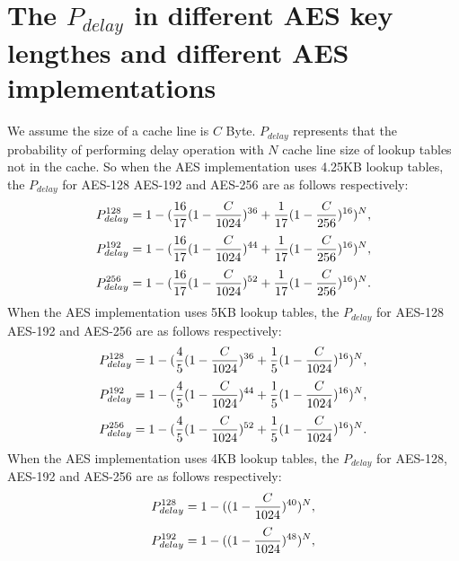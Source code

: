 \section{The $P_{delay}$ in different AES key lengthes and different AES implementations }
\label{appendixb}
We assume the size of a cache line is $C$ Byte. $P_{delay}$ represents that the probability of performing delay operation with $N$ cache line size of lookup tables not in the cache. So when the AES implementation uses 4.25KB lookup tables, the $P_{delay}$ for AES-128 AES-192 and AES-256 are as follows respectively:
\begin{equation}
    \scriptsize
    P_{delay}^{128} = 1- (\frac{16}{17}(1-\frac{C}{1024})^{36}+ \frac{1}{17}(1-\frac{C}{256})^{16})^{N},
\end{equation}
\begin{equation}
    \scriptsize
    P_{delay}^{192} = 1- (\frac{16}{17}(1-\frac{C}{1024})^{44}+ \frac{1}{17}(1-\frac{C}{256})^{16})^{N},
\end{equation}
\begin{equation}
    \scriptsize
    P_{delay}^{256} = 1- (\frac{16}{17}(1-\frac{C}{1024})^{52}+ \frac{1}{17}(1-\frac{C}{256})^{16})^{N}.
\end{equation}
When the AES implementation uses 5KB lookup tables, the $P_{delay}$ for AES-128 AES-192 and AES-256 are as follows respectively:
\begin{equation}
    \scriptsize
    P_{delay}^{128} = 1- (\frac{4}{5}(1-\frac{C}{1024})^{36}+ \frac{1}{5}(1-\frac{C}{1024})^{16})^{N},
\end{equation}
\begin{equation}
    \scriptsize
    P_{delay}^{192} = 1- (\frac{4}{5}(1-\frac{C}{1024})^{44}+ \frac{1}{5}(1-\frac{C}{1024})^{16})^{N},
\end{equation}
\begin{equation}
    \scriptsize
    P_{delay}^{256} = 1- (\frac{4}{5}(1-\frac{C}{1024})^{52}+ \frac{1}{5}(1-\frac{C}{1024})^{16})^{N}.
\end{equation}
When the AES implementation uses 4KB lookup tables, the $P_{delay}$ for AES-128, AES-192 and AES-256 are as follows respectively:
\begin{equation}
    \scriptsize
    P_{delay}^{128} = 1- ((1-\frac{C}{1024})^{40})^{N},
\end{equation}
\begin{equation}
    \scriptsize
    P_{delay}^{192} = 1- ((1-\frac{C}{1024})^{48})^{N},
\end{equation}
